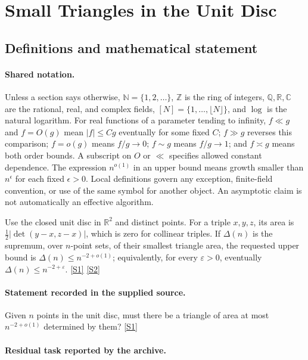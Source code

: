 \documentclass[11pt,a4paper]{article}
\newcommand{\N}{\mathbb{N}}
\newcommand{\Z}{\mathbb{Z}}
\newcommand{\Q}{\mathbb{Q}}
\newcommand{\R}{\mathbb{R}}
\newcommand{\C}{\mathbb{C}}
\newcommand{\sref}[2]{\hyperlink{source:#1:#2}{[S#2]}}
\begin{document}
\section{Small Triangles in the Unit Disc}\label{statement}


\subsection{Definitions and mathematical statement}

\paragraph{Shared notation.}Unless a section says otherwise, $\N=\{1,2,\ldots\}$,
$\Z$ is the ring of integers, $\Q,\R,\C$ are the rational, real, and complex
fields, $[N]=\{1,\ldots,\lfloor N\rfloor\}$, and $\log$ is the natural
logarithm. For real functions of a parameter tending to infinity,
$f\ll g$ and $f=O(g)$ mean $|f|\leq Cg$ eventually for some fixed $C$;
$f\gg g$ reverses this comparison; $f=o(g)$ means $f/g\to0$;
$f\sim g$ means $f/g\to1$; and $f\asymp g$ means both order bounds.
A subscript on $O$ or $\ll$ specifies allowed constant dependence.
The expression $n^{o(1)}$ in an upper bound means growth smaller than
$n^\epsilon$ for each fixed $\epsilon>0$. Local definitions govern any
exception, finite-field convention, or use of the same symbol for another
object. An asymptotic claim is not automatically an effective algorithm.



Use the closed unit disc in $\R^2$ and distinct points. For a triple $x,y,z$, its area is $\tfrac12|\det(y-x,z-x)|$, which is zero for collinear triples. If $\Delta(n)$ is the supremum, over $n$-point sets, of their smallest triangle area, the requested upper bound is $\Delta(n)\leq n^{-2+o(1)}$; equivalently, for every $\varepsilon>0$, eventually $\Delta(n)\leq n^{-2+\varepsilon}$. \sref{statement}{1} \sref{statement}{2}

\paragraph{Statement recorded in the supplied source.}
Given $n$ points in the unit disc, must there be a triangle of area at most $n^{-2+o(1)}$ determined by them? \sref{statement}{1}

\paragraph{Residual task reported by the archive.}
\end{document}
